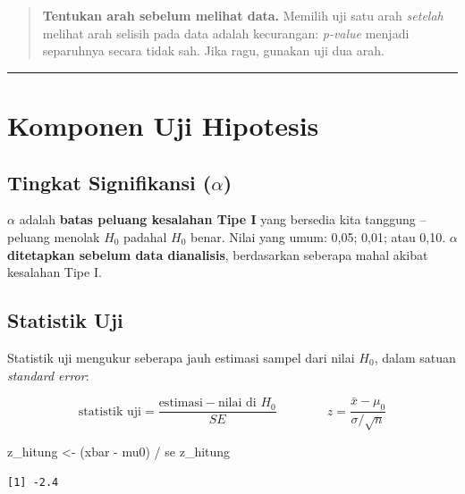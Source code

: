 \documentclass[
  indonesian,
  letterpaper,
]{book}
\newenvironment{Shaded}{\begin{snugshade}}{\end{snugshade}}
\newcommand{\NormalTok}[1]{\textcolor[rgb]{0.00,0.23,0.31}{#1}}
\newcommand{\OtherTok}[1]{\textcolor[rgb]{0.00,0.23,0.31}{#1}}
\newcommand{\SpecialCharTok}[1]{\textcolor[rgb]{0.37,0.37,0.37}{#1}}
\begin{document}
\begin{quote}
\textbf{Tentukan arah sebelum melihat data.} Memilih uji satu arah
\emph{setelah} melihat arah selisih pada data adalah kecurangan:
\emph{p-value} menjadi separuhnya secara tidak sah. Jika ragu, gunakan
uji dua arah.
\end{quote}

\begin{center}\rule{0.5\linewidth}{0.5pt}\end{center}


\chapter{Komponen Uji Hipotesis}\label{komponen-uji-hipotesis}

\section{\texorpdfstring{Tingkat Signifikansi
(\(\alpha\))}{Tingkat Signifikansi (\textbackslash alpha)}}\label{tingkat-signifikansi-alpha}

\(\alpha\) adalah \textbf{batas peluang kesalahan Tipe I} yang bersedia
kita tanggung -- peluang menolak \(H_0\) padahal \(H_0\) benar. Nilai
yang umum: 0,05; 0,01; atau 0,10. \(\alpha\) \textbf{ditetapkan sebelum
data dianalisis}, berdasarkan seberapa mahal akibat kesalahan Tipe I.

\section{Statistik Uji}\label{statistik-uji}

Statistik uji mengukur seberapa jauh estimasi sampel dari nilai \(H_0\),
dalam satuan \emph{standard error}:

\[
\text{statistik uji} = \frac{\text{estimasi} - \text{nilai di } H_0}{SE}
\qquad\qquad
z = \frac{\bar{x} - \mu_0}{\sigma/\sqrt{n}}
\]

\begin{Shaded}
\begin{Highlighting}[]
\NormalTok{z\_hitung }\OtherTok{\textless{}{-}}\NormalTok{ (xbar }\SpecialCharTok{{-}}\NormalTok{ mu0) }\SpecialCharTok{/}\NormalTok{ se}
\NormalTok{z\_hitung}
\end{Highlighting}
\end{Shaded}

\begin{verbatim}
[1] -2.4
\end{verbatim}
\end{document}
